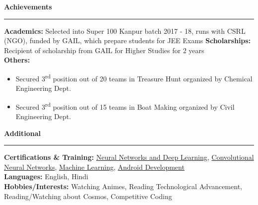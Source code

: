 \documentclass[11pt]{article}
\begin{document}

    \textbf{\large{Achievements}}
    \vspace{3pt}
    \hrule
    \vspace{6pt}
    \textbf{Academics:} Selected into Super 100 Kanpur batch 2017 - 18, runs with CSRL (NGO), funded by GAIL, which prepare students for JEE Exams
    \newline
    \textbf{Scholarships:} Recipient of scholarship from GAIL for Higher Studies for 2 years\\
    \textbf{Others:}
    \begin{itemize}
        \setlength{\itemsep}{0pt}
        \setlength{\parskip}{0pt}
        \setlength{\parsep}{0pt}
        \item Secured 3\textsuperscript{rd} position out of 20 teams in Treasure Hunt organized by Chemical Engineering Dept.
        \item Secured 3\textsuperscript{rd} position out of 15 teams in Boat Making organized by Civil Engineering Dept.
    \end{itemize}
    
    \textbf{\large{Additional}}
    \vspace{3pt}
    \hrule
    \vspace{6pt}
    \textbf{Certifications \& Training:} \href{https://drive.google.com/file/d/1mir_TBy9GinXpSU3H-8LyYn68GkcM62f/view?usp=sharing}{Neural Networks and Deep Learning}, \href{https://drive.google.com/file/d/18cQMPfNLtvY4-Ozh7hZnUIDKYh9tRYPG/view?usp=sharing}{Convolutional Neural Networks}, \href{https://drive.google.com/file/d/13L4JKQ1pwLG9YVevPVZLNRLUeZWGkvyU/view?usp=sharing}{Machine Learning}, \href{https://drive.google.com/file/d/1Hp5dvhNVz9FvjQ6Y4vIVZldKpb8m8LCp/view?usp=sharing}{Android Development}\\
    \textbf{Languages:} English, Hindi\\
    \textbf{Hobbies/Interests:} Watching Animes, Reading Technological Advancement, Reading/Watching about Cosmos, Competitive Coding
    
\end{document}

